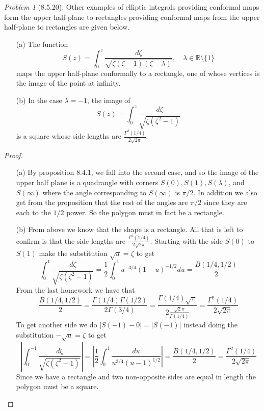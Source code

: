 \documentclass[10pt]{article}
\newcommand{\sk}{\vskip 10mm}
\newcommand{\bb}[1]{\mathbb{#1}}
\theoremstyle{remark}
\newtheorem{problem}{Problem}
\theoremstyle{remark}
\begin{document}
\sk

\begin{problem}[8.5.20]
  Other examples of elliptic integrals providing conformal maps form the upper
  half-plane to rectangles providing conformal maps from the upper half-plane
  to rectangles are given below.
  \begin{enumerate}
  \item[(a)] The function
    \[
      S(z)=\int_0^z\frac{d\zeta}{\sqrt{\zeta(\zeta-1)(\zeta-\lambda)}},\quad \lambda\in\bb{R}\setminus\{1\}
    \]
    maps the upper half-plane conformally to a rectangle, one of whose vertices
    is the image of the point at infinity.
  \item[(b)] In the case $\lambda=-1$, the image of
    \[
      S(z)=\int_0^z\frac{d\zeta}{\sqrt{\zeta(\zeta^2-1)}}
    \]
    is a square whose side lengths are $\frac{\Gamma^2(1/4)}{2\sqrt{2\pi}}$.
  \end{enumerate}
\end{problem}

\begin{proof}
  \begin{enumerate}
  \item[(a)] By proposition 8.4.1, we fall into the second case, and so the
    image of the upper half plane is a quadrangle with corners $S(0),S(1),S(\lambda)$, and
    $S(\infty)$ where the angle corresponding to $S(\infty)$ is $\pi/2$. In addition we also get
    from the proposition that the rest of the angles are $\pi/2$ since they are each to
    the $1/2$ power. So the polygon must in fact be a rectangle.
  \item[(b)] From above we know that the shape is a rectangle. All that is left
    to confirm is that the side lengths are $\frac{\Gamma^2(1/4)}{2\sqrt{2\pi}}$.
    Starting with the side $S(0)$ to $S(1)$ make the substitution $\sqrt{u}=\zeta$ to get
    \[
      \int_0^1\frac{d\zeta}{\sqrt{\zeta(\zeta^2-1)}}=\frac{1}{2}\int_0^1u^{-3/4}(1-u)^{-1/2}du = \frac{B(1/4,1/2)}{2}
    \]
    From the last homework we have that
    \[
      \frac{B(1/4,1/2)}{2}=\frac{\Gamma(1/4)\Gamma(1/2)}{2\Gamma(3/4)}=\frac{\Gamma(1/4)\sqrt{\pi}}{2\frac{\sqrt{2}\pi}{\Gamma(1/4)}}=\frac{\Gamma^2(1/4)}{2\sqrt{2\pi}}
    \]
    To get another side we do $|S(-1)-0|=|S(-1)|$ instead doing the substitution $-\sqrt{u}=\zeta$ to get
    \[
      |\int_0^{-1}\frac{d\zeta}{\sqrt{\zeta(\zeta^2-1)}}| = |\frac{1}{2}\int_0^1\frac{du}{u^{3/4}(u-1)^{1/2}}|=\frac{B(1/4,1/2)}{2}=\frac{\Gamma^2(1/4)}{2\sqrt{2\pi}}
    \]
    Since we have a rectangle and two non-opposite sides are equal in length
    the polygon must be a square.
  \end{enumerate}
\end{proof}
\end{document}
